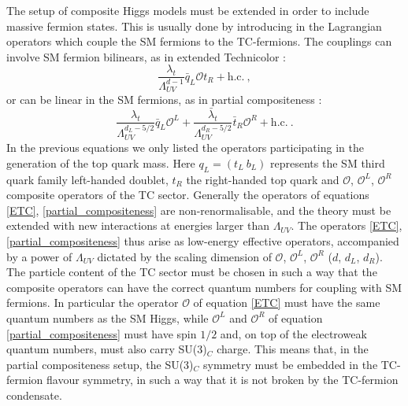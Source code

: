 The setup of composite Higgs models must be extended in order to include massive fermion states. This is usually done by introducing in the Lagrangian operators which couple the SM fermions to the TC-fermions. The couplings can involve SM fermion bilinears, as in extended Technicolor \cite{Dimopoulos:1979es,Eichten:1979ah}:
\begin{equation}
\frac{\lambda_t}{\Lambda_{UV}^{d-1}} \bar q_L \mathcal O t_R + \mathrm{h.c.} \: ,
\label{ETC}
\end{equation}
%
or can be linear in the SM fermions, as in partial compositeness \cite{Kaplan:1991dc}:
\begin{equation}
\frac{\lambda_t}{\Lambda_{UV}^{d_L - 5/2}} \bar q_L \mathcal O^L + \frac{\bar \lambda_t}{\Lambda_{UV}^{d_R - 5/2}} \bar t_R  \mathcal O^R + \mathrm{h.c.} \: .
\label{partial_compositeness}
\end{equation}
%
In the previous equations we only listed the operators participating in the generation of the top quark mass. Here $q_L = (t_L \: b_L)$ represents the SM third quark family left-handed doublet, $t_R$ the right-handed top quark and $\mathcal O$, $\mathcal O^L$, $\mathcal O^R$ composite operators of the TC sector. Generally the operators of equations \ref{ETC}, \ref{partial_compositeness} are non-renormalisable, and the theory must be extended with new interactions at energies larger than $\Lambda_{UV}$. The operators \ref{ETC}, \ref{partial_compositeness} thus arise as low-energy effective operators, accompanied by a power of $\Lambda_{UV}$ dictated by the scaling dimension of $\mathcal O$, $\mathcal O^L$, $\mathcal O^R$ ($d$, $d_L$, $d_R$). The particle content of the TC sector must be chosen in such a way that the composite operators can have the correct quantum numbers for coupling with SM fermions. In particular the operator $\mathcal O$ of equation \ref{ETC} must have the same quantum numbers as the SM Higgs, while $\mathcal O^L$ and $\mathcal O^R$ of equation \ref{partial_compositeness} must have spin $1/2$ and, on top of the electroweak quantum numbers, must also carry SU(3)$_C$ charge. This means that, in the partial compositeness setup, the SU(3)$_C$ symmetry must be embedded in the TC-fermion flavour symmetry, in such a way that it is not broken by the TC-fermion condensate.

